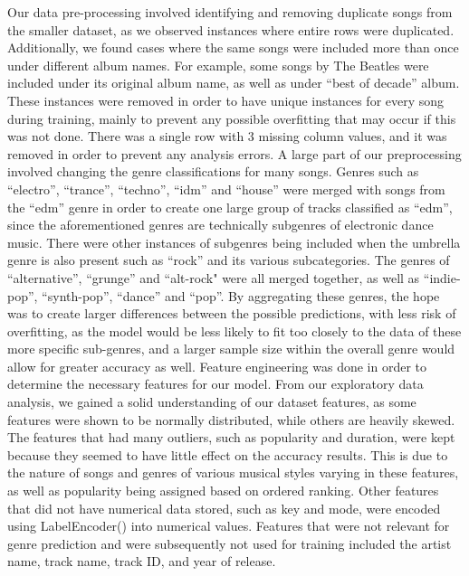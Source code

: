 \documentclass[times, twocolumn]{article}
\begin{document}
Our data pre-processing involved identifying and removing duplicate songs from the smaller dataset, as we observed instances where entire rows were duplicated. Additionally, we found cases where the same songs were included more than once under different album names. For example, some songs by The Beatles were included under its original album name, as well as under “best of decade” album. These instances were removed in order to have unique instances for every song during training, mainly to prevent any possible overfitting that may occur if this was not done. There was a single row with 3 missing column values, and it was removed in order to prevent any analysis errors. A large part of our preprocessing involved changing the genre classifications for many songs.  Genres such as “electro”, “trance”,  “techno”,  “idm” and “house” were merged with songs from the “edm” genre in order to create one large group of tracks classified as “edm”, since the aforementioned genres are technically subgenres of electronic dance music. There were other instances of subgenres being included when the umbrella genre is also present such as “rock” and its various subcategories. The genres of “alternative”, “grunge” and “alt-rock" were all merged together, as well as “indie-pop”, “synth-pop”, “dance” and “pop”. By aggregating these genres, the hope was to create larger differences between the possible predictions, with less risk of overfitting, as the model would be less likely to fit too closely to the data of these more specific sub-genres, and a larger sample size within the overall genre would allow for greater accuracy as well.
Feature engineering was done in order to determine the necessary features for our model. From our exploratory data analysis, we gained a solid understanding of our dataset features, as some features were shown to be normally distributed, while others are heavily skewed. The features that had many outliers, such as popularity and duration, were kept because they seemed to have little effect on the accuracy results. This is due to the nature of songs and genres of various musical styles varying in these features, as well as popularity being assigned based on ordered ranking. Other features that did not have numerical data stored, such as key and mode, were encoded using LabelEncoder() into numerical values. Features that were not relevant for genre prediction and were subsequently not used for training included the artist name, track name, track ID, and year of release. \\\\
\end{document}
